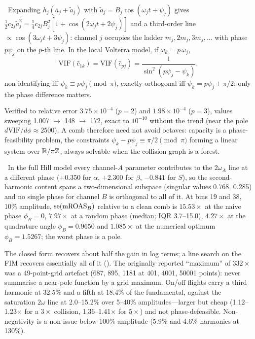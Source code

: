 \begin{theorem}
\label{ident:thm:phase}
\tagEstablished\ Expanding $h_j(\bar a_j + \tilde a_j)$ with $\tilde a_j = B_j\cos(\omega_jt + \psi_j)$ gives $\tfrac12c_{2j}\tilde a_j^2 = \tfrac14c_{2j}B_j^2[1 + \cos(2\omega_jt + 2\psi_j)]$ and a third-order line $\propto\cos(3\omega_jt + 3\psi_j)$: channel $j$ occupies the ladder $m_j, 2m_j, 3m_j, \ldots$ with phase $p\psi_j$ on the $p$-th line. In the local Volterra model, if $\omega_k = p\,\omega_j$,
\begin{equation}
\mathrm{VIF}(\hat c_{1k}) = \mathrm{VIF}(\hat c_{pj}) = \frac{1}{\sin^2(p\psi_j - \psi_k)},
\label{ident:eq:phaselaw}
\end{equation}
non-identifying iff $\psi_k \equiv p\psi_j \pmod\pi$, exactly orthogonal iff $\psi_k = p\psi_j \pm \pi/2$; only the phase difference matters.
\end{theorem}

Verified to relative error $3.75\times10^{-4}$ ($p = 2$) and $1.98\times10^{-4}$ ($p = 3$), values sweeping 1.007 $\to$ 148 $\to$ 172, exact to $10^{-10}$ without the trend (near the pole $d\mathrm{VIF}/d\phi \approx 2500$). A comb therefore need not avoid octaves: capacity is a phase-feasibility problem, the constraints $\psi_k - p\psi_j \equiv \pi/2 \pmod\pi$ forming a linear system over $\mathbb{R}/\pi\mathbb Z$, always solvable when the collision graph is a forest.

\begin{proposition}
\label{ident:prop:wrongangle}
\tagNumerical\ In the full Hill model every channel-$A$ parameter contributes to the $2\omega_A$ line at a different phase ($+0.350$ for $\alpha$, $+2.300$ for $\beta$, $-0.841$ for $S$), so the second-harmonic content spans a two-dimensional subspace (singular values 0.768, 0.285) and no single phase for channel $B$ is orthogonal to all of it. At bins 19 and 38, 10\% amplitude, $\mathrm{se}(\mathrm{mROAS}_B)$ relative to a clean comb is $15.53\times$ at the naive phase $\phi_B = 0$, $7.97\times$ at a random phase (median; IQR 3.7--15.0), $4.27\times$ at the quadrature angle $\phi_B = 0.9650$ and $1.085\times$ at the numerical optimum $\phi_B = 1.5267$; the worst phase is a pole.
\end{proposition}

The closed form recovers about half the gain in log terms; a line search on the FIM recovers essentially all of it (). The originally reported ``maximum'' of $332\times$ was a 49-point-grid artefact (687, 895, 1181 at 401, 4001, 50001 points): never summarise a near-pole function by a grid maximum. On/off flights carry a third harmonic at 32.5\% and a fifth at 18.4\% of the fundamental, against the saturation $2\omega$ line at 2.0--15.2\% over 5--40\% amplitudes---larger but cheap (1.12--1.23$\times$ for a $3\times$ collision, 1.36--1.41$\times$ for $5\times$) and not phase-defeasible. Non-negativity is a non-issue below 100\% amplitude (5.9\% and 4.6\% harmonics at 130\%).

